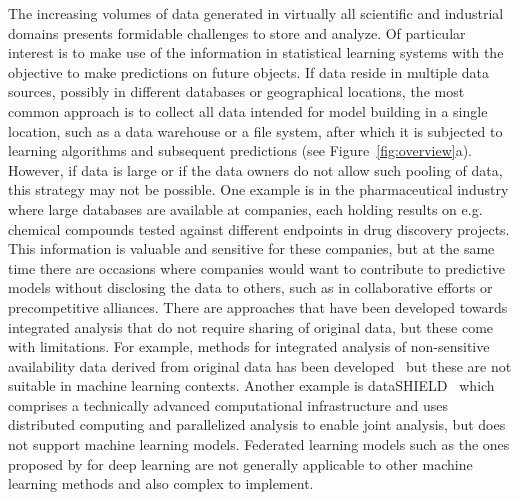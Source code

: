 \documentclass[main]{subfiles}
\begin{document}
The increasing volumes of data generated in virtually all scientific and industrial domains presents formidable challenges to store and analyze. Of particular interest is to make use of the information in statistical learning systems with the objective to make predictions on future objects. If data reside in multiple data sources, possibly in different databases or geographical locations, the most common approach is to collect all data intended for model building in a single location, such as a data warehouse or a file system, after which it is subjected to learning algorithms and subsequent predictions (see Figure~\ref{fig:overview}a). However, if data is large or if the data owners do not allow such pooling of data, this strategy may not be possible. One example is in the pharmaceutical industry where large databases are available at companies, each holding results on e.g. chemical compounds tested against different endpoints in drug discovery projects. This information is valuable and sensitive for these companies, but at the same time there are occasions where companies would want to contribute to predictive models without disclosing the data to others, such as in collaborative efforts or precompetitive alliances. There are approaches that have been developed towards integrated analysis that do not require sharing of original data, but these come with limitations. For example, methods for integrated analysis of non-sensitive availability data derived from original data has been developed~\citep{Spjuth:2016ly} but these are not suitable in machine learning contexts. Another example is dataSHIELD~\citep{Gaye:2014sf} which comprises a technically advanced computational infrastructure and uses distributed computing and parallelized analysis to enable joint analysis, but does not support machine learning models. Federated learning models such as the ones proposed by \cite{Shokri:2015os} for deep learning are not generally applicable to other machine learning methods and also complex to implement.
 
\end{document}
